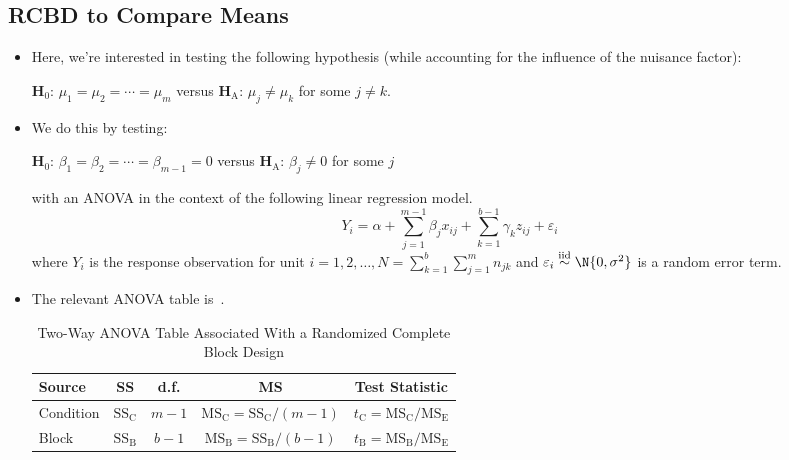 \subsection{RCBD to Compare Means}
\begin{itemize}
      \item Here, we're interested in testing the following hypothesis (while accounting for the influence of the
            nuisance factor):
            \begin{tightcenter}
                  $ \mathbf{H}_0 $: $ \mu_1=\mu_2=\cdots=\mu_m $ versus $ \mathbf{H}_\text{A} $: $ \mu_j\ne \mu_k $ for some $ j\ne k $.
            \end{tightcenter}
      \item We do this by testing:
            \begin{tightcenter}
                  $ \mathbf{H}_0 $: $ \beta_1=\beta_2=\cdots=\beta_{m-1}=0 $ versus $ \mathbf{H}_\text{A} $: $ \beta_j\ne 0 $ for some $ j $
            \end{tightcenter}
            with an ANOVA in the context of the following linear regression model.
            \[ Y_i=\alpha+\sum_{j=1}^{m-1} \beta_j x_{ij}+\sum_{k=1}^{b-1} \gamma_k z_{ij}+\varepsilon_i \]
            where $ Y_i $ is the response observation for unit $ i=1,2,\ldots,N=\sum_{k=1}^{b} \sum_{j=1}^{m} n_{jk} $
            and $ \varepsilon_i \stackrel{\text{iid}}{\sim}\N{0,\sigma^2} $ is a random error term.
      \item The relevant ANOVA table is~.
            \begin{table}[!htbp]
                  \centering
                  \caption{Two-Way ANOVA Table Associated With a Randomized Complete Block Design}\label{two_way_ANOVA_RCBD}
                  \begin{NiceTabular}{|l|c|c|c|c|}
                        \toprule
                        Source    & SS                     & d.f.        & MS                                                                   & Test Statistic                                           \\
                        \midrule
                        Condition & $ \text{SS}_\text{C} $ & $ m-1 $     & $ \text{MS}_\text{C}=\text{SS}_\text{C}/(m-1) $     & $ t_\text{C}=\text{MS}_\text{C}/\text{MS}_\text{E} $ \\
                        Block     & $ \text{SS}_\text{B} $ & $ b-1 $     & $ \text{MS}_\text{B}=\text{SS}_\text{B}/(b-1) $     & $ t_\text{B}=\text{MS}_\text{B}/\text{MS}_\text{E} $ \\

\end{NiceTabular}
\end{table}
\end{itemize}
